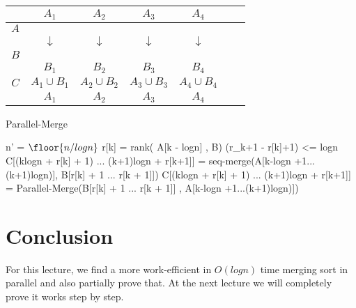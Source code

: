 \documentclass[11pt]{article}
\begin{document}
\begin{center}
\begin{tabular}{ |c|c|c|c|c|c|c| }
  \multicolumn{1}{c}{} &
  \multicolumn{1}{c}{$A_1$} &
  \multicolumn{1}{c}{$A_2$} &
  \multicolumn{1}{c}{$A_3$} &
  \multicolumn{1}{c}{$A_4$} &
  \multicolumn{1}{c}{}\\
\hline
 $A$  & & & & & & \\
 \hline
  \multicolumn{1}{c}{} &
  \multicolumn{1}{c}{$\downarrow$} &
  \multicolumn{1}{c}{$\downarrow$} &
  \multicolumn{1}{c}{$\downarrow$} &
  \multicolumn{1}{c}{$\downarrow$} &
  \multicolumn{1}{c}{} \\
 \hline
 $B$ & & & & & & \\
 \hline
 \multicolumn{1}{c}{} &
 \multicolumn{1}{c}{$B_1$} &
 \multicolumn{1}{c}{$B_2$} &
 \multicolumn{1}{c}{$B_3$} &
 \multicolumn{1}{c}{$B_4$} &
 \multicolumn{1}{c}{} \\
 \hline
 $C$  & $A_1 \cup B_1$ &$A_2 \cup B_2$  &$A_3 \cup B_3$  & $A_4 \cup B_4$ & & \\
 \hline
 \multicolumn{1}{c}{} &
 \multicolumn{1}{c}{$A_1$} &
 \multicolumn{1}{c}{$A_2$} &
 \multicolumn{1}{c}{$A_3$} &
 \multicolumn{1}{c}{$A_4$} &
 \multicolumn{1}{c}{}\\
 
\end{tabular}
\end{center}


\begin{algorithm}
\caption{Parallel-Merge}
\begin{algorithmic}[1]
\State n' = $\floor{n/logn}$
  \State r[k] = rank( A[k - logn] , B)
  \If (r_k+1 - r[k]+1) <= logn
  \State C[(klogn + r[k] + 1) ... (k+1)logn + r[k+1]] = seq-merge(A[k-logn +1...(k+1)logn)], B[r[k] + 1 ... r[k + 1]])
  \else
  \State C[(klogn + r[k] + 1) ... (k+1)logn + r[k+1]] = Parallel-Merge(B[r[k] + 1 ... r[k + 1]] , A[k-logn +1...(k+1)logn)])
  \EndIf
\EndFor
\end{algorithmic}
\end{algorithm}

\section{Conclusion}
For this lecture, we find a more work-efficient in $O(logn)$ time merging sort in parallel and also partially prove that.  At the next lecture we will completely prove it works step by step. 

%

\end{document}
